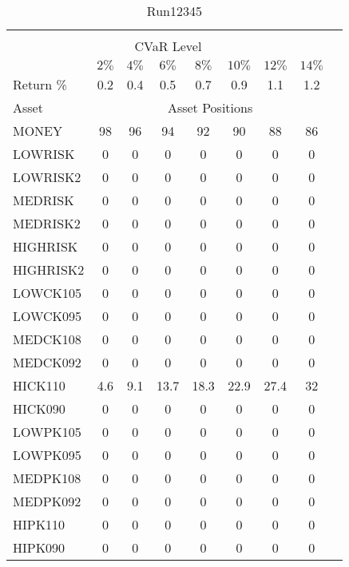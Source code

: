\begin{table}[h!t]
\caption{Run12345}
\centering
\begin{tabular}[t]{ l c c c c c c c c }
\hline\hline \\
\multicolumn{8}{c}{CVaR Level} \\
 & $2\%$ & $4\%$ & $6\%$ & $8\%$ & $10\%$ & $12\%$ & $14\%$ \\[0.5ex]
Return \% &0.2 &0.4 &0.5 &0.7 &0.9 &1.1 &1.2\\[0.5ex]
Asset & \multicolumn{7}{c}{Asset Positions} \\[1ex]
MONEY & 98 & 96 & 94 & 92 & 90 & 88 & 86\\
LOWRISK & 0 & 0 & 0 & 0 & 0 & 0 & 0\\
LOWRISK2 & 0 & 0 & 0 & 0 & 0 & 0 & 0\\
MEDRISK & 0 & 0 & 0 & 0 & 0 & 0 & 0\\
MEDRISK2 & 0 & 0 & 0 & 0 & 0 & 0 & 0\\
HIGHRISK & 0 & 0 & 0 & 0 & 0 & 0 & 0\\
HIGHRISK2 & 0 & 0 & 0 & 0 & 0 & 0 & 0\\
LOWCK105 & 0 & 0 & 0 & 0 & 0 & 0 & 0\\
LOWCK095 & 0 & 0 & 0 & 0 & 0 & 0 & 0\\
MEDCK108 & 0 & 0 & 0 & 0 & 0 & 0 & 0\\
MEDCK092 & 0 & 0 & 0 & 0 & 0 & 0 & 0\\
HICK110 & 4.6 & 9.1 & 13.7 & 18.3 & 22.9 & 27.4 & 32\\
HICK090 & 0 & 0 & 0 & 0 & 0 & 0 & 0\\
LOWPK105 & 0 & 0 & 0 & 0 & 0 & 0 & 0\\
LOWPK095 & 0 & 0 & 0 & 0 & 0 & 0 & 0\\
MEDPK108 & 0 & 0 & 0 & 0 & 0 & 0 & 0\\
MEDPK092 & 0 & 0 & 0 & 0 & 0 & 0 & 0\\
HIPK110 & 0 & 0 & 0 & 0 & 0 & 0 & 0\\
HIPK090 & 0 & 0 & 0 & 0 & 0 & 0 & 0\\
[1ex] \hline
\end{tabular}
\end{table} 